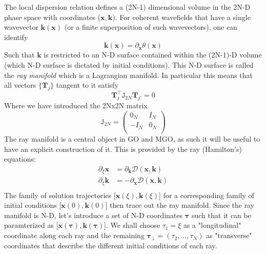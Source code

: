 \documentclass{article}
\begin{document}
The local dispersion relation defines a (2N-1) dimensional
volume in the 2N-D phase space with coordinates ($\mathbf{x},\mathbf{k}$). For coherent wavefields that have a single wavevector $\mathbf{k}(\mathbf{x})$ (or a finite superposition of such wavevectors), one can identify
\begin{equation}
    \label{eq:theta}
    \mathbf{k}(\mathbf{x}) = \partial_\mathbf{x}\theta(\mathbf{x})
\end{equation}
Such that $\mathbf{k} $ is restricted to an N-D surface
contained within the (2N-1)-D volume (which N-D surface is
dictated by initial conditions). This N-D surface is called
the \textit{ray manifold} which is a Lagrangian manifold.
In particular this means that all vectors $\{\mathbf{T}_j\}$ tangent to it
satisfy
\begin{equation}
    \mathbf{T}_j^\intercal \mathtt{J}_{2N}  \mathbf{T}_{j'} = 0
\end{equation}
Where we have introduced the 2Nx2N matrix
\begin{equation}
    \mathtt{J}_{2N} = 
    \begin{pmatrix}
        0_N & I_N \\
        -I_N & 0_N \\
    \end{pmatrix}
\end{equation}
The ray manifold is a central object in GO and MGO, as such it
will be useful to have an explicit construction of it.
This is provided by the ray (Hamilton's) equations:
\begin{eqnarray}
    \partial_\xi \mathbf{x} &= \partial_\mathbf{k}\mathcal{D}(\mathbf{x},\mathbf{k})\\
    \partial_\xi \mathbf{k} &= -\partial_\mathbf{x}\mathcal{D}(\mathbf{x},\mathbf{k})\\
\end{eqnarray}
The family of solution trajectories [$\mathbf{x}(\xi),\mathbf{k}(\xi)$] for a corresponding family
of initial conditions [$\mathbf{x}(0),\mathbf{k}(0)$] then trace out the ray manifold.
Since the ray manifold is N-D, let's introduce a set of N-D coordinates 
$\mathbf{\tau}$ such that it can be paramterized as [$\mathbf{x}(\mathbf{\tau}),\mathbf{k}(\mathbf{\tau})$].
We shall choose $\tau_1 = \xi$ as a "longitudinal" coordinate along each ray and the remaining
$\mathbf{\tau}_\perp  \stackrel{.}{=} (\tau_2,...,\tau_N)$ as "transverse" coordinates that describe the different
initial conditions of each ray.
\end{document}
